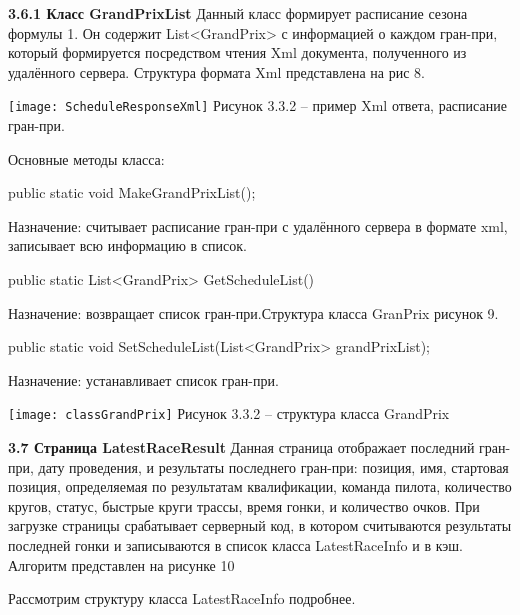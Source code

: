 \documentclass[14pt,a4paper]{extreport}
\begin{document}
	\textbf{3.6.1 Класс GrandPrixList}
\flushleft\parindent=1cm Данный класс формирует расписание сезона формулы 1. Он содержит List<GrandPrix>  с информацией о каждом гран-при, который формируется посредством чтения  Xml документа, полученного из удалённого сервера.
Структура формата Xml представлена на рис 8.\par
	\texttt{[image: ScheduleResponseXml]}   
           \center Рисунок 3.3.2 – пример Xml ответа, расписание гран-при.\par
\flushleft\parindent=1cm Основные методы класса:\par
 \par
public static void MakeGrandPrixList();\par
Назначение: считывает расписание гран-при с удалённого сервера в формате xml, записывает всю информацию в список.\par

public static List<GrandPrix> GetScheduleList()\par
Назначение: возвращает список гран-при.Структура класса GranPrix рисунок 9.\par

public static void SetScheduleList(List<GrandPrix> grandPrixList);\par
Назначение: устанавливает список гран-при.\par

	\texttt{[image: classGrandPrix]}   
           \center Рисунок 3.3.2 – структура класса GrandPrix\par

	\textbf{3.7 Страница LatestRaceResult}
\flushleft\parindent=1cm Данная страница отображает последний гран-при, дату проведения, и результаты последнего гран-при: позиция, имя, стартовая позиция, определяемая по результатам квалификации, команда пилота, количество кругов, статус, быстрые круги трассы, время гонки, и количество очков. При загрузке страницы срабатывает серверный код, в котором считываются результаты последней гонки и записываются в список класса LatestRaceInfo и в кэш. Алгоритм представлен на рисунке 10\par
Рассмотрим структуру класса LatestRaceInfo подробнее.\par



	\newpage
\end{document}
